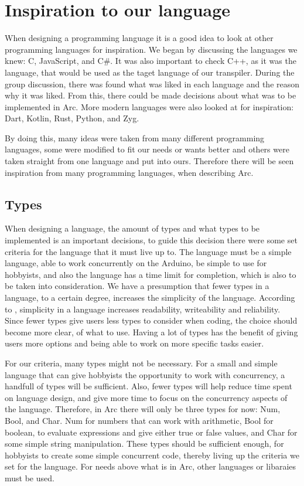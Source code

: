 \section{Inspiration to our language}\label{sec:inspiration}
When designing a programming language it is a good idea to look at other programming languages for inspiration. We began by discussing the languages we knew: C, JavaScript, and C\#. It was also important to check C++, as it was the language, that would be used as the taget language of our transpiler. During the group discussion, there was found what was liked in each language and the reason why it was liked. From this, there could be made decisions about what was to be implemented in Arc. More modern languages were also looked at for inspiration: Dart, Kotlin, Rust, Python, and Zyg. 

By doing this, many ideas were taken from many different programming languages, some were modified to fit our needs or wants better and others were taken straight from one language and put into ours. Therefore there will be seen inspiration from many programming languages, when describing Arc.


\subsection{Types}\label{sec:types}
When designing a language, the amount of types and what types to be implemented is an important decisions, to guide this decision there were some set criteria for the language that it must live up to. The language must be a simple language, able to work concurrently on the Arduino, be simple to use for hobbyists, and also the language has a time limit for completion, which is also to be taken into consideration. We have a presumption that fewer types in a language, to a certain degree, increases the simplicity of the language. According to , simplicity in a language increases readability, writeability and reliability. Since fewer types give users less types to consider when coding, the choice should become more clear, of what to use. Having a lot of types has the benefit of giving users more options and being able to work on more specific tasks easier.

For our criteria, many types might not be necessary. For a small and simple language that can give hobbyists the opportunity to work with concurrency, a handfull of types will be sufficient. Also, fewer types will help reduce time spent on language design, and give more time to focus on the concurrency aspects of the language. Therefore, in Arc there will only be three types for now: Num, Bool, and Char. Num for numbers that can work with arithmetic, Bool for boolean, to evaluate expressions and give either true or false values, and Char for some simple string manipulation. These types should be sufficient enough, for hobbyists to create some simple concurrent code, thereby living up the criteria we set for the language. For needs above what is in Arc, other languages or libaraies must be used. 

